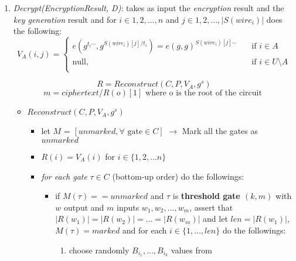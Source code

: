 \documentclass[12pt]{article}
\begin{document}
\begin{enumerate}
\begin{itemize}
\begin{itemize}
\begin{itemize}
				\end{itemize} 
			\end{itemize}
		\end{itemize}
	\item \textit{Decrypt(EncryptionResult, D)}: takes as input the \textit{encryption} result and the \textit{key generation} result and  for $i \in {1, 2, ...,n}$ and $j \in {1, 2, ..., |S(wire_i)|}$ does the following:
        \[   
        V_A(i,j) = 
             \begin{cases}
               e(g^{t_i\cdots}, g^{S(wire_i)[j] / t_i}) = e(g, g) ^{ S(wire_i)[j]\cdots}  &\quad\text{if } i \in A\\
               \text{null,} &\quad \text{if } i \in U \setminus A \\
             \end{cases}
        \]

        $$R = Reconstruct(C, P, V_A, g^s)$$
        $$m = ciphertext / R(o)[1] \textrm{ where o is the root of the circuit }$$
        
		\begin{itemize}
			\item $Reconstruct(C, P, V_A, g^s)$
			\begin{itemize}
				\item let $M$ = $[unmarked, \forall \textrm{ gate} \in C]$ $\rightarrow$ Mark all the gates as $unmarked$
				\item $R(i) = V_A(i)$ for $i \in \{1, 2, ...n\}$
				\item \textit{for each gate} $\tau \in C$ (bottom-up order) do the followings:
				\begin{itemize}
				    \item if $M(\tau) == unmarked$ and $\tau$ is \textbf{threshold gate $(k, m)$} with $w$ output and $m$ inputs $w_1, w_2, ..., w_m$, assert that $|R(w_1)| = |R(w_2)| = ... = |R(w_m)|$ and let $len = |R(w_1)|$, $M(\tau) = marked$ and for each $i \in \{1, ..., len\}$ do the followings:
				    \begin{enumerate}
				        \item choose randomly $B_{i_1}, ..., B_{i_k}$ values from 
				        

\end{enumerate}
\end{itemize}
\end{itemize}
\end{itemize}
\end{enumerate}
\end{document}
